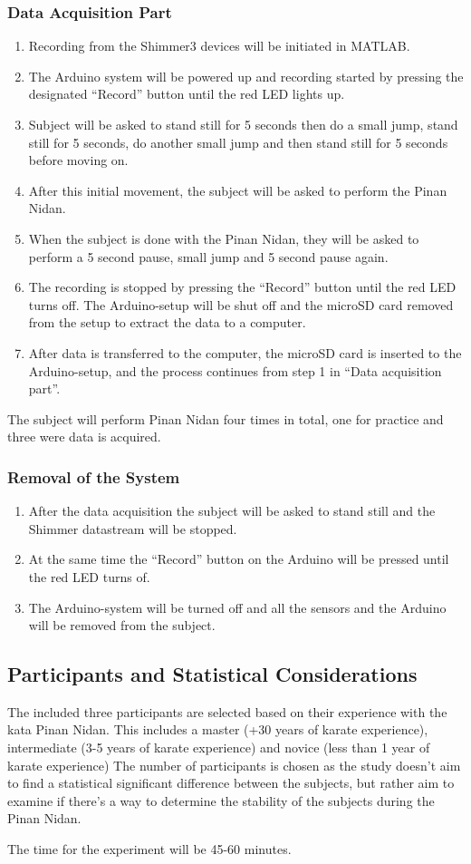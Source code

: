 \subsubsection{Data Acquisition Part}
\begin{enumerate}
\item Recording from the Shimmer3 devices will be initiated in MATLAB.
\item The Arduino system will be powered up and recording started by pressing the designated “Record” button until the red LED lights up.
\item Subject will be asked to stand still for 5 seconds then do a small jump, stand still for 5 seconds, do another small jump and then stand still for 5 seconds before moving on.
\item After this initial movement, the subject will be asked to perform the Pinan Nidan.
\item When the subject is done with the Pinan Nidan, they will be asked to perform a 5 second pause, small jump and 5 second pause again.
\item The recording is stopped by pressing the “Record” button until the red LED turns off. The Arduino-setup will be shut off and the microSD card removed from the setup to extract the data to a computer.
\item After data is transferred to the computer, the microSD card is inserted to the Arduino-setup, and the process continues from step 1 in “Data acquisition part”.
\end{enumerate}

The subject will perform Pinan Nidan four times in total, one for practice and three were data is acquired.

\subsubsection{Removal of the System}
\begin{enumerate}
\item After the data acquisition the subject will be asked to stand still and the Shimmer datastream will be stopped. 
\item At the same time the “Record” button on the Arduino will be pressed until the red LED turns of. 
\item The Arduino-system will be turned off and all the sensors and the Arduino will be removed from the subject.
\end{enumerate}

\subsection{Participants and Statistical Considerations}
The included three participants are selected based on their experience with the kata Pinan Nidan. This includes a master (+30 years of karate experience), intermediate (3-5 years of karate experience) and novice (less than 1 year of karate experience) The number of participants is chosen as the study doesn’t aim to find a statistical significant difference between the subjects, but rather aim to examine if there’s a way to determine the stability of the subjects during the Pinan Nidan.

The time for the experiment will be 45-60 minutes.
